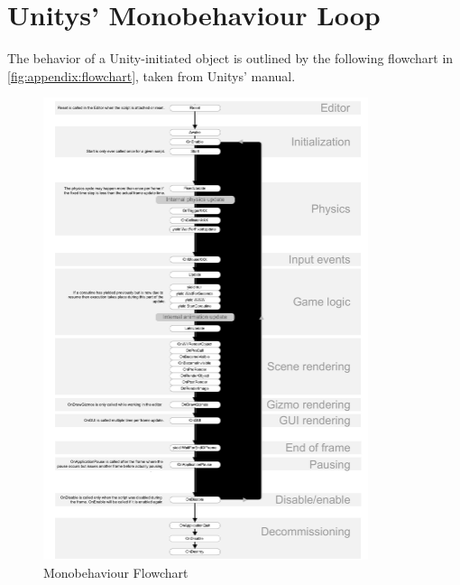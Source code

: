 %

\chapter{Unitys' Monobehaviour Loop}
\label{app:engineloop}

The behavior of a Unity-initiated object is outlined by the following 
flowchart in \ref{fig:appendix:flowchart}, taken from Unitys' manual.

\begin{figure}[htb]
	\centering
	\includegraphics[width=0.85\textwidth]{_external/media/monobehaviour_flowchart.pdf}
	\caption{Monobehaviour Flowchart}
	\label{fig:offsets:components}
\end{figure}